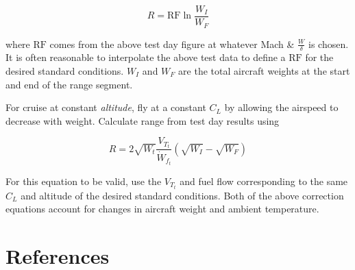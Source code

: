 \documentclass[
]{book}
\begin{document}
\[
R = \mathrm{RF} \ln \frac{W_I}{W_F}
\label{eq:rng-factor-const-M-w-delta}
\]

where \(\mathrm{RF}\) comes from the above test day figure at whatever Mach \&
\(\frac{W}{\delta}\) is chosen. It is often reasonable to interpolate the above
test data to define a \(\mathrm{RF}\) for the desired standard conditions.
\(W_I\) and \(W_F\) are the total aircraft weights at the start and end of the
range segment.

For cruise at constant \emph{altitude}, fly at a constant \(C_L\) by allowing the
airspeed to decrease with weight. Calculate range from test day results using

\[
R = 2 \sqrt{W_t} \frac{V_{T_t}}{\dot{W}_{f_t}} \left( \sqrt{W_I} - \sqrt{W_F} \right)
\label{eq:rng-const-alt}
\]

For this equation to be valid, use the \(V_{T_t}\) and fuel flow corresponding
to the same \(C_L\) and altitude of the desired standard conditions. Both of the
above correction equations account for changes in aircraft weight and ambient
temperature.

\hypertarget{references-10}{%
\section{References}\label{references-10}}
\end{document}
